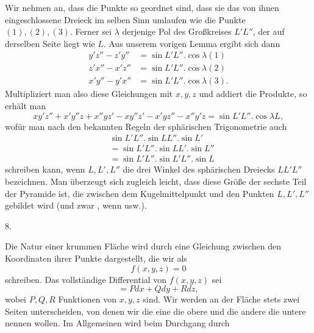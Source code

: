 \par{}%
\noindent\hspace*{1.2em}Wir nehmen an, dass die Punkte so geordnet sind, dass sie das von ihnen eingeschlossene Dreieck im selben Sinn umlaufen wie die Punkte $(1),(2),(3)$. Ferner sei $\lambda$ derjenige Pol des Großkreises $L'L''$, der auf derselben Seite liegt wie $L$. Aus unserem vorigen Lemma ergibt sich dann
\[
\begin{aligned}
y'z''-z'y''&=\sin L'L''.\cos\lambda(1)\\
z'x''-x'z''&=\sin L'L''.\cos\lambda(2)\\
x'y''-y'x''&=\sin L'L''.\cos\lambda(3).
\end{aligned}
\]
Multipliziert man also diese Gleichungen mit $x,y,z$ und addiert die Produkte, so erhält man
\[
xy'z''+x'y''z+x''yz'-xy''z'-x'yz''-x''y'z=\sin L'L''.\cos\lambda L,
\]
wofür man nach den bekannten Regeln der sphärischen Trigonometrie auch
\[
\begin{aligned}
&\sin L'L''.\sin LL''.\sin L'\\
&=\sin L'L''.\sin LL'.\sin L''\\
&=\sin L'L''.\sin L'L''.\sin L
\end{aligned}
\]
schreiben kann, wenn $L,L',L''$ die drei Winkel des sphärischen Dreiecks $LL'L''$ bezeichnen. Man überzeugt sich zugleich leicht, dass diese Größe der sechste Teil der Pyramide ist, die zwischen dem Kugelmittelpunkt und den Punkten $L,L',L''$ gebildet wird (und zwar , wenn usw.).

\begin{center}8.\end{center}
\noindent\hspace*{1.2em}Die Natur einer krummen Fläche wird durch eine Gleichung zwischen den Koordinaten ihrer Punkte dargestellt, die wir als
\[
f(x,y,z)=0
\]
schreiben. Das vollständige Differential von $f(x,y,z)$ sei
\[
=Pdx+Qdy+Rdz,
\]
wobei $P,Q,R$ Funktionen von $x,y,z$ sind. Wir werden an der Fläche stets zwei Seiten unterscheiden, von denen wir die eine die obere und die andere die untere nennen wollen. Im Allgemeinen wird beim Durchgang durch\space%
